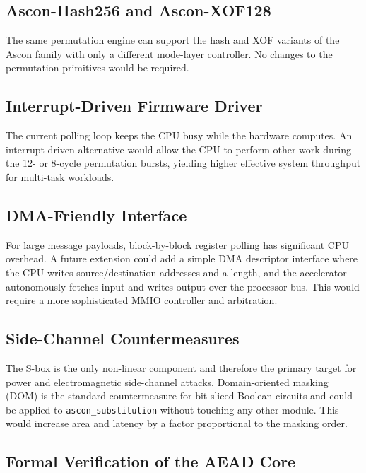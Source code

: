 \documentclass[11pt,a4paper]{article}
\begin{document}
\subsection{Ascon-Hash256 and Ascon-XOF128}

The same permutation engine can support the hash and XOF variants of the Ascon
family with only a different mode-layer controller. No changes to the
permutation primitives would be required.

\subsection{Interrupt-Driven Firmware Driver}

The current polling loop keeps the CPU busy while the hardware computes.
An interrupt-driven alternative would allow the CPU to perform other work
during the 12- or 8-cycle permutation bursts, yielding higher effective
system throughput for multi-task workloads.

\subsection{DMA-Friendly Interface}

For large message payloads, block-by-block register polling has significant
CPU overhead. A future extension could add a simple DMA descriptor interface
where the CPU writes source/destination addresses and a length, and the
accelerator autonomously fetches input and writes output over the processor
bus. This would require a more sophisticated MMIO controller and arbitration.

\subsection{Side-Channel Countermeasures}

The S-box is the only non-linear component and therefore the primary target
for power and electromagnetic side-channel attacks. Domain-oriented masking
(DOM) is the standard countermeasure for bit-sliced Boolean circuits and
could be applied to \texttt{ascon\_substitution} without touching any other
module. This would increase area and latency by a factor proportional to the
masking order.

\subsection{Formal Verification of the AEAD Core}
\end{document}
